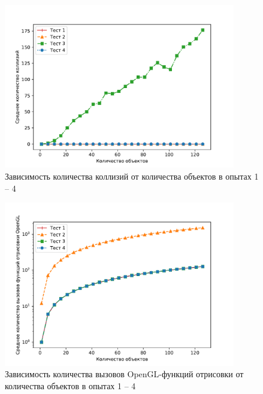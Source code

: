\begin{figure}[H]
	\centering
    \includegraphics[width=0.9\textwidth]{img/1234/plot_collisions.pdf}
	\caption{Зависимость количества коллизий от количества объектов в опытах 1 -- 4}
	\label{fig:1234:col}
\end{figure}

\begin{figure}[H]
	\centering
    \includegraphics[width=0.9\textwidth]{img/1234/plot_draw_calls.pdf}
	\caption{Зависимость количества вызовов OpenGL-функций отрисовки от количества объектов в опытах 1 -- 4}
	\label{fig:1234:dc}
\end{figure}

